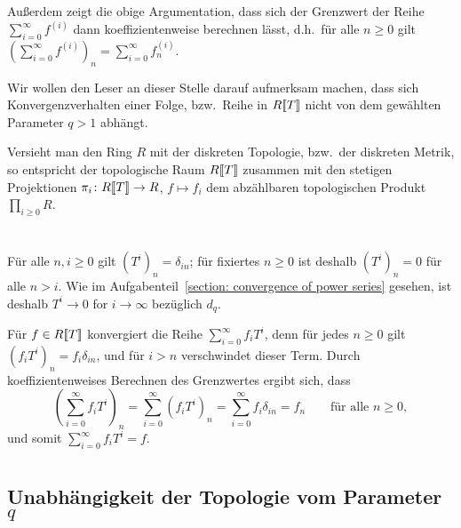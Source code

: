 \documentclass[a4paper, 10pt, numbers=noenddot]{scrartcl}
\begin{document}
Außerdem zeigt die obige Argumentation, dass sich der Grenzwert der Reihe $\sum_{i=0}^\infty f^{(i)}$ dann koeffizientenweise berechnen lässt, d.h.\ für alle $n \geq 0$ gilt $(\sum_{i=0}^\infty f^{(i)})_n = \sum_{i=0}^\infty f^{(i)}_n$.

Wir wollen den Leser an dieser Stelle darauf aufmerksam machen, dass sich Konvergenzverhalten einer Folge, bzw.\ Reihe in $R[\![T]\!]$ nicht von dem gewählten Parameter $q > 1$ abhängt.

\begin{remark}
  Versieht man den Ring $R$ mit der diskreten Topologie, bzw.\ der diskreten Metrik, so entspricht der topologische Raum $R[\![T]\!]$ zusammen mit den stetigen Projektionen $\pi_i \colon R[\![T]\!] \to R$, $f \mapsto f_i$ dem abzählbaren topologischen Produkt $\prod_{i \geq 0} R$.
\end{remark}





\section{}

Für alle $n, i \geq 0$ gilt $(T^i)_n = \delta_{in}$;
für fixiertes $n \geq 0$ ist deshalb $(T^i)_n = 0$ für alle $n > i$.
Wie im Aufgabenteil~\ref{section: convergence of power series} gesehen, ist deshalb $T^i \to 0$ for $i \to \infty$ bezüglich $d_q$.

Für $f \in R[\![T]\!]$ konvergiert die Reihe $\sum_{i=0}^\infty f_i T^i$, denn für jedes $n \geq 0$ gilt $(f_i T^i)_n = f_i \delta_{in}$, und für $i > n$ verschwindet dieser Term.
Durch koeffizientenweises Berechnen des Grenzwertes ergibt sich, dass
\[
    \left( \sum_{i=0}^\infty f_i T^i \right)_n
  = \sum_{i=0}^\infty (f_i T^i)_n
  = \sum_{i=0}^\infty f_i \delta_{in}
  = f_n
  \qquad
  \text{für alle $n \geq 0$},
\]
und somit $\sum_{i=0}^\infty f_i T^i = f$.





\section{}



\subsection*{Unabhängigkeit der Topologie vom Parameter $q$}
\end{document}
